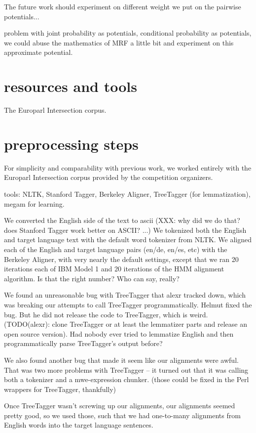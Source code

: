 \documentclass[11pt,letterpaper]{article}
\begin{document}
The future work should experiment on different weight we put on the pairwise potentials...

problem with joint probability as potentials, 
conditional probability as potentials, we could abuse the mathematics of MRF a little bit and experiment on this approximate potential.
\section{resources and tools}
The Europarl Intersection corpus.
	

\section{preprocessing steps}
For simplicity and comparability with previous work, we worked entirely with
the Europarl Intersection corpus provided by the competition organizers.


tools: NLTK, Stanford Tagger, Berkeley Aligner, TreeTagger (for lemmatization),
megam for learning.


We converted the English side of the text to ascii (XXX: why did we do that?
does Stanford Tagger work better on ASCII? ...) We tokenized both the English
and target language text with the default word tokenizer from NLTK.  We aligned
each of the English and target language pairs (en/de, en/es, etc) with the
Berkeley Aligner, with very nearly the default settings, except that we ran 20
iterations each of IBM Model 1 and 20 iterations of the HMM alignment
algorithm. Is that the right number? Who can say, really?


We found an unreasonable bug with TreeTagger that alexr tracked down, which was
breaking our attempts to call TreeTagger programmatically. Helmut fixed the
bug. But he did not release the code to TreeTagger, which is weird.
(TODO(alexr): clone TreeTagger or at least the lemmatizer parts and release an
open source version). Had nobody ever tried to lemmatize English and then
programmatically parse TreeTagger's output before?


We also found another bug that made it seem like our alignments were awful.
That was two more problems with TreeTagger -- it turned out that it was calling
both a tokenizer and a mwe-expression chunker. (those could be fixed in the
Perl wrappers for TreeTagger, thankfully)


Once TreeTagger wasn't screwing up our alignments, our alignments seemed pretty
good, so we used those, such that we had one-to-many alignments from English
words into the target language sentences.
\end{document}
